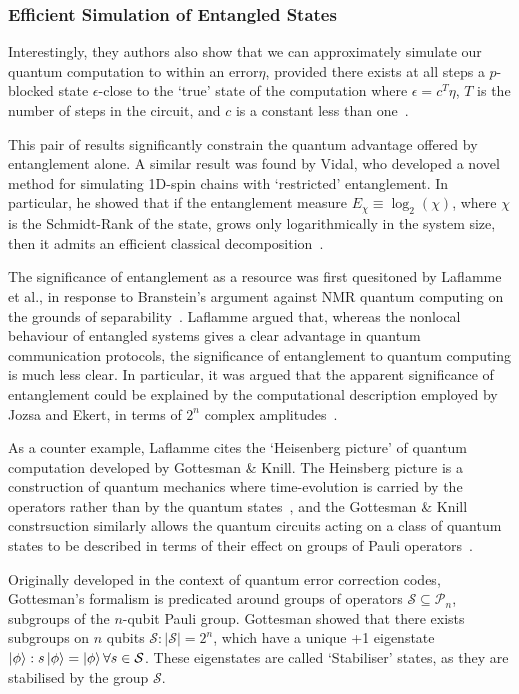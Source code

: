 \documentclass{standalone}
\begin{document}
\subsubsection*{Efficient Simulation of Entangled States}\label{sec:gk}
Interestingly, they authors also show that we can approximately simulate our quantum computation to within an error$\eta$, provided there exists at all steps a $p$-blocked state $\epsilon$-close to the `true' state of the computation where $\epsilon=c^{T}\eta$, $T$ is the number of steps in the circuit, and $c$ is a constant less than one~\cite{Jozsa2003}. 
\par
This pair of results significantly constrain the quantum advantage offered by entanglement alone. A similar result was found by Vidal, who developed a novel method for simulating 1D-spin chains with `restricted' entanglement. In particular, he showed that if the entanglement measure $E_{\chi}\equiv\log_{2}(\chi)$, where $\chi$ is the Schmidt-Rank of the state, grows only logarithmically in the system size, then it admits an efficient classical decomposition~\cite{Vidal2003}.
\par
\par
The significance of entanglement as a resource was first quesitoned by Laflamme et al., in response to Branstein's argument against NMR quantum computing on the grounds of separability~\cite{Laflamme2001}. Laflamme argued that, whereas the nonlocal behaviour of entangled systems gives a clear advantage in quantum communication protocols, the significance of entanglement to quantum computing is much less clear. In particular, it was argued that the apparent significance of entanglement could be explained by the computational description employed by Jozsa and Ekert, in terms of $2^{n}$ complex amplitudes~\cite{Laflamme2001}.
\par
As a counter example, Laflamme cites the `Heisenberg picture' of quantum computation developed by Gottesman \& Knill. The Heinsberg picture is a construction of quantum mechanics where time-evolution is carried by the operators rather than by the quantum states~\cite{Nielsen2000}, and the Gottesman \& Knill constrsuction similarly allows the quantum circuits acting on a class of quantum states to be described in terms of their effect on groups of Pauli operators~\cite{Gottesman1999a}. 
\par
Originally developed in the context of quantum error correction codes, Gottesman's formalism is predicated around groups of operators $\mathcal{S}\subseteq\mathcal{P}_{n}$, subgroups of the $n$-qubit Pauli group. Gottesman showed that there exists subgroups on $n$ qubits $\mathcal{S}:\vert\mathcal{S}\vert=2^{n}$, which have a unique +1 eigenstate $\ket{\phi}:s\ket{\phi}=\ket{\phi}\forall s\in\mathcal{S}$. These eigenstates are called `Stabiliser' states, as they are stabilised by the group $\mathcal{S}$.
\end{document}
